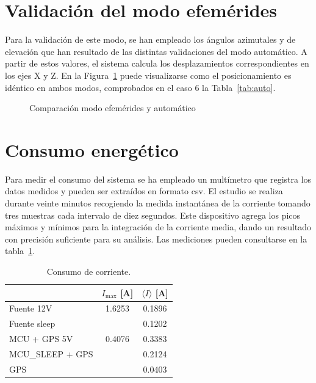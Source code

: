 \section{Validación del modo efemérides}

Para la validación de este modo, se han empleado los ángulos azimutales y de elevación que han resultado de las distintas validaciones del modo automático. A partir de estos valores, el sistema calcula los desplazamientos correspondientes en los ejes X y Z. En la Figura~\ref{fig:ephvsauto} puede visualizarse como el posicionamiento es idéntico en ambos modos, comprobados en el caso 6 la Tabla~\ref{tab:auto}.

\begin{figure}
	\centering
	\caption{Comparación modo efemérides y automático}
	\label{fig:ephvsauto}
\end{figure}

\section{Consumo energético}

Para medir el consumo del sistema se ha empleado un multímetro que registra los datos medidos y pueden ser extraídos en formato csv. El estudio se realiza durante veinte minutos recogiendo la medida instantánea de la corriente tomando tres muestras cada intervalo de diez segundos. Este dispositivo agrega los picos máximos y mínimos para la integración de la corriente media, dando un resultado con precisión suficiente para su análisis. Las mediciones pueden consultarse en la tabla~\ref{tabla:intensidad}.

\begin{table}[b]
	\centering
	\begin{tabular}{|l|c|c|}
		\hline
		\textbf{} & \textbf{$I_{\max}$ [A]} & \textbf{$\langle I \rangle$ [A]} \\
		\hline
		Fuente 12V           & 1.6253 & 0.1896 \\
		Fuente sleep         &        & 0.1202 \\
		MCU + GPS 5V         & 0.4076 & 0.3383 \\
		MCU\_SLEEP + GPS     &        & 0.2124 \\
		GPS                  &        & 0.0403 \\
		\hline
	\end{tabular}
	\caption{Consumo de corriente.}
	\label{tabla:intensidad}
\end{table}


